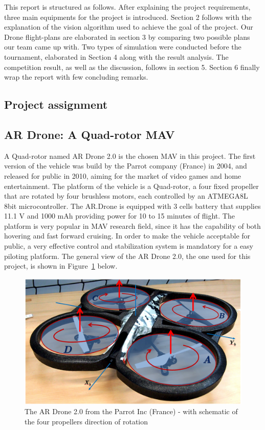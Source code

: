 This report is structured as follows. After explaining the project requirements, three main equipments for the project is introduced. Section 2 follows with the explanation of the vision algorithm used to achieve the goal of the project. Our Drone flight-plans are elaborated in section 3 by comparing two possible plans our team came up with. Two types of simulation were conducted before the tournament, elaborated in Section 4 along with the result analysis. The competition result, as well as the discussion, follows in section 5. Section 6 finally wrap the report with few concluding remarks.

\subsection{Project assignment}



\subsection{AR Drone: A Quad-rotor MAV}
A Quad-rotor named AR Drone 2.0 is the chosen MAV in this project. The first version of the vehicle was build by the Parrot company (France) in 2004, and released for public in 2010, aiming for the market of video games and home entertainment\cite{Bristeau:11}. The platform of the vehicle is a Quad-rotor, a four fixed propeller that are rotated by four brushless motors, each controlled by an ATMEGA8L 8bit microcontroller. The AR.Drone is equipped with 3 cells battery that supplies 11.1 V and 1000 mAh providing power for 10 to 15 minutes of flight. The platform is very popular in MAV research field\cite{Bristeau:11}\cite{Pestana:13}\cite{Lugo:14}, since it has the capability of both hovering and fast forward cruising. In order to make the vehicle acceptable for public, a very effective control and stabilization system is mandatory for a easy piloting platform. The general view of the AR Drone 2.0, the one used for this project, is shown in Figure~\ref{f:TheDrone} below.

\begin{figure}
\includegraphics[width=1\linewidth]{Figures/TheDrone.png}
\centering
\caption{The AR Drone 2.0 from the Parrot Inc (France) - with schematic of the four propellers direction of rotation}
\label{f:TheDrone}
\end{figure}


